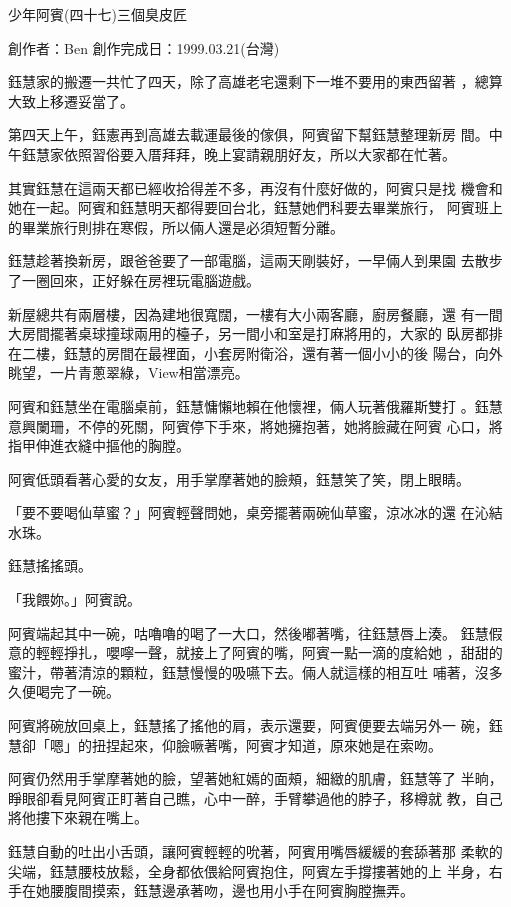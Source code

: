 



少年阿賓(四十七)三個臭皮匠

創作者：Ben
創作完成日：1999.03.21(台灣)


鈺慧家的搬遷一共忙了四天，除了高雄老宅還剩下一堆不要用的東西留著
，總算大致上移遷妥當了。

第四天上午，鈺憲再到高雄去載運最後的傢俱，阿賓留下幫鈺慧整理新房
間。中午鈺慧家依照習俗要入厝拜拜，晚上宴請親朋好友，所以大家都在忙著。

其實鈺慧在這兩天都已經收拾得差不多，再沒有什麼好做的，阿賓只是找
機會和她在一起。阿賓和鈺慧明天都得要回台北，鈺慧她們科要去畢業旅行，
阿賓班上的畢業旅行則排在寒假，所以倆人還是必須短暫分離。

鈺慧趁著換新房，跟爸爸要了一部電腦，這兩天剛裝好，一早倆人到果園
去散步了一圈回來，正好躲在房裡玩電腦遊戲。

新屋總共有兩層樓，因為建地很寬闊，一樓有大小兩客廳，廚房餐廳，還
有一間大房間擺著桌球撞球兩用的檯子，另一間小和室是打麻將用的，大家的
臥房都排在二樓，鈺慧的房間在最裡面，小套房附衛浴，還有著一個小小的後
陽台，向外眺望，一片青蔥翠綠，View相當漂亮。

阿賓和鈺慧坐在電腦桌前，鈺慧慵懶地賴在他懷裡，倆人玩著俄羅斯雙打
。鈺慧意興闌珊，不停的死關，阿賓停下手來，將她擁抱著，她將臉藏在阿賓
心口，將指甲伸進衣縫中摳他的胸膛。

阿賓低頭看著心愛的女友，用手掌摩著她的臉頰，鈺慧笑了笑，閉上眼睛。

「要不要喝仙草蜜？」阿賓輕聲問她，桌旁擺著兩碗仙草蜜，涼冰冰的還
在沁結水珠。

鈺慧搖搖頭。

「我餵妳。」阿賓說。

阿賓端起其中一碗，咕嚕嚕的喝了一大口，然後嘟著嘴，往鈺慧唇上湊。
鈺慧假意的輕輕掙扎，嚶嚀一聲，就接上了阿賓的嘴，阿賓一點一滴的度給她
，甜甜的蜜汁，帶著清涼的顆粒，鈺慧慢慢的吸嚥下去。倆人就這樣的相互吐
哺著，沒多久便喝完了一碗。

阿賓將碗放回桌上，鈺慧搖了搖他的肩，表示還要，阿賓便要去端另外一
碗，鈺慧卻「嗯」的扭捏起來，仰臉噘著嘴，阿賓才知道，原來她是在索吻。

阿賓仍然用手掌摩著她的臉，望著她紅嫣的面頰，細緻的肌膚，鈺慧等了
半晌，睜眼卻看見阿賓正盯著自己瞧，心中一醉，手臂攀過他的脖子，移樽就
教，自己將他摟下來親在嘴上。

鈺慧自動的吐出小舌頭，讓阿賓輕輕的吮著，阿賓用嘴唇緩緩的套舔著那
柔軟的尖端，鈺慧腰枝放鬆，全身都依偎給阿賓抱住，阿賓左手撐摟著她的上
半身，右手在她腰腹間摸索，鈺慧邊承著吻，邊也用小手在阿賓胸膛撫弄。

